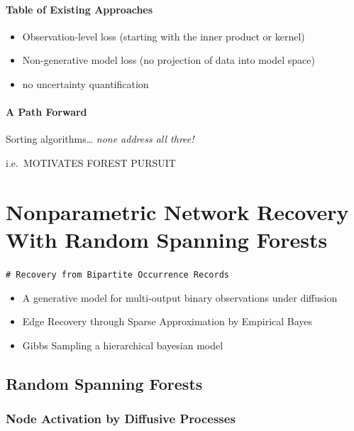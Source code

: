 \documentclass[%
	12pt,
		oneside,
		letterpaper
]{book}
\providecommand{\tightlist}{%
  \setlength{\itemsep}{0pt}\setlength{\parskip}{0pt}}\usepackage{longtable,booktabs,array}
\begin{document}
\subsection{Table of Existing
Approaches}\label{table-of-existing-approaches}

\begin{itemize}
\tightlist
\item
  Observation-level loss (starting with the inner product or kernel)
\item
  Non-generative model loss (no projection of data into model space)
\item
  no uncertainty quantification
\end{itemize}

\subsection{A Path Forward}\label{a-path-forward}

Sorting algorithms\ldots{} \emph{none address all three!}

i.e.~MOTIVATES FOREST PURSUIT

\part{Nonparametric Network Recovery With Random Spanning Forests}

\texttt{\#\ Recovery\ from\ Bipartite\ Occurrence\ Records}

\begin{itemize}
\tightlist
\item
  A generative model for multi-output binary observations under
  diffusion
\item
  Edge Recovery through Sparse Approximation by Empirical Bayes
\item
  Gibbs Sampling a hierarchical bayesian model
\end{itemize}

\chapter{Random Spanning Forests}\label{random-spanning-forests}

\section{Node Activation by Diffusive
Processes}\label{node-activation-by-diffusive-processes}
\end{document}

